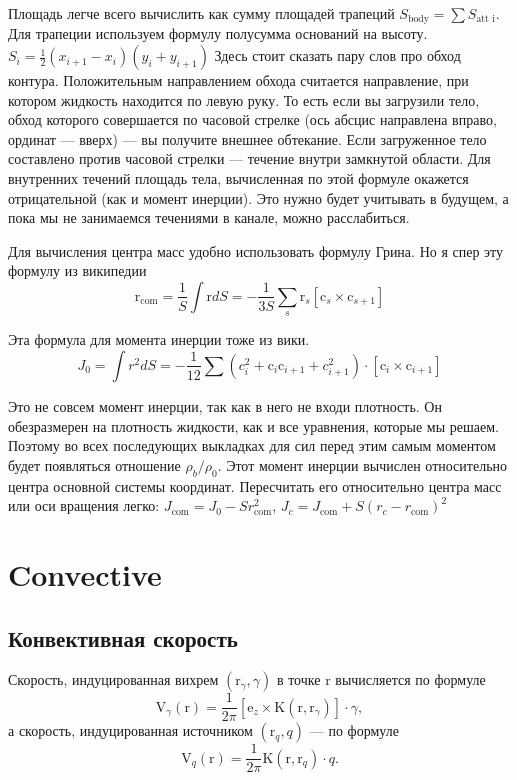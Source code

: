 \documentclass[14pt]{extreport}
\newcommand{\br}[1]{\boldsymbol{\mathrm{#1}}}
\renewcommand{\vec}[1]{\br{#1}}
\begin{document}
Площадь легче всего вычислить как сумму площадей трапеций $S_\text{body} = \sum S_\text{att~i}$. Для трапеции используем формулу полусумма оснований на высоту. $S_i = \frac{1}{2}(x_{i+1}-x_i)(y_i+y_{i+1})$
Здесь стоит сказать пару слов про обход контура. Положительным направлением обхода считается направление, при котором жидкость находится по левую руку. То есть если вы загрузили тело, обход которого совершается по часовой стрелке (ось абсцис направлена вправо, ординат --- вверх) --- вы получите внешнее обтекание. Если загруженное тело составлено против часовой стрелки --- течение внутри замкнутой области. Для внутренних течений площадь тела, вычисленная по этой формуле окажется отрицательной (как и момент инерции). Это нужно будет учитывать в будущем, а пока мы не занимаемся течениями в канале, можно расслабиться.

Для вычисления центра масс удобно использовать формулу Грина. Но я спер эту формулу из википедии
\begin{equation*}
\vec r_\text{com}
= \dfrac{1}{S}\int \vec r dS
= -\dfrac{1}{3S}\sum_s \vec r_s [\vec c_{s} \times \vec c_{s+1}]
\end{equation*}

Эта формула для момента инерции тоже из вики.
\begin{equation*}
J_0 = \int r^2 dS =
-\dfrac{1}{12} \sum 
\left(
	c_i^2 + \vec c_i \vec c_{i+1} + c_{i+1}^2
\right) \cdot [\vec c_i \times \vec c_{i+1}]
\end{equation*}

Это не совсем момент инерции, так как в него не входи плотность. Он обезразмерен на плотность жидкости, как и все уравнения, которые мы решаем. Поэтому во всех последующих выкладках для сил перед этим самым моментом будет появляться отношение $\rho_b/\rho_0$.
Этот момент инерции вычислен относительно центра основной системы координат. Пересчитать его относительно центра масс или оси вращения легко: $J_\text{com} = J_0 - S r_\text{com}^2$, $J_c = J_\text{com} + S (r_c - r_\text{com})^2$

\section{Convective}
\subsection{Конвективная скорость}
Скорость, индуцированная вихрем $(\vec r_\gamma, \gamma)$ в точке $\vec r$
вычисляется по формуле
\begin{equation}
\label{eq_VortexConvective}
\vec V_\gamma(\vec r) = \frac{1}{2\pi} [\vec e_z \times \vec K(\vec r, \vec r_\gamma)] \cdot \gamma,
\end{equation}
а скорость, индуцированная источником $(\vec r_q, q)$ --- по формуле
\begin{equation}
\label{eq_SourceConvective}
\vec V_q(\vec r) = \frac{1}{2\pi} \vec K(\vec r, \vec r_q) \cdot q.
\end{equation}
\end{document}
